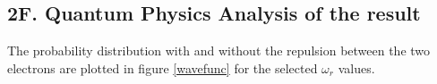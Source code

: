 \documentclass[%
reprint,
amsmath,amssymb,
aps,
]{revtex4-1}
\begin{document}
\subsection{2F. Quantum Physics Analysis of the result}\noindent 
The probability distribution with and without the repulsion between the two electrons are plotted in figure \ref{wavefunc} for the selected $\omega_r$ values. \\ \newpage 

\begin{figure}
	\centering
	 \\ 
	

\end{figure}
\end{document}
